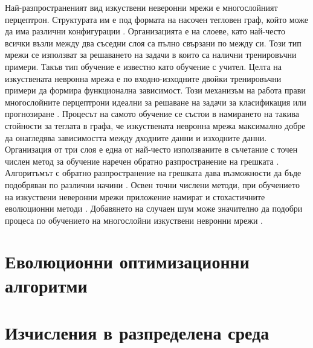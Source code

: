 Най-разпространеният вид изкуствени неверонни мрежи е многослойният перцептрон. Структурата им е под формата на насочен тегловен граф, който може да има различни конфигурации \cite{da-Silva-01}. Организацията е на слоеве, като най-често всички възли между два съседни слоя са пълно свързани по между си. Този тип мрежи се използват за решаването на задачи в които са налични тренировъчни примери. Такъв тип обучение е известно като обучение с учител. Целта на изкуствената невронна мрежа е по входно-изходните двойки тренировъчни примери да формира функционална зависимост. Този механизъм на работа прави многослойните перцептрони идеални за решаване на задачи за класификация или прогнозиране \cite{Basheer-01}. Процесът на самото обучение се състои в намирането на такива стойности за теглата в графа, че изкуствената невронна мрежа максимално добре да онагледява зависимостта между дходните данни и изходните данни. Организация от три слоя е една от най-често използваните в съчетание с точен числен метод за обучение наречен обратно разпространение на грешката \cite{Pomerleau-01}. Алгоритъмът с обратно разпространение на грешката дава възможности да бъде подобряван по различни начини \cite{Kollias-01}. Освен точни числени методи, при обучението на изкуствени неверонни мрежи приложение намират и стохастичните еволюционни методи \cite{Slowik-01}. Добавянето на случаен шум може значително да подобри процеса по обучението на многослойни изкуствени невронни мрежи \cite{Sietsma-01}.

\section{Еволюционни оптимизационни алгоритми}

\section{Изчисления в разпределена среда}


